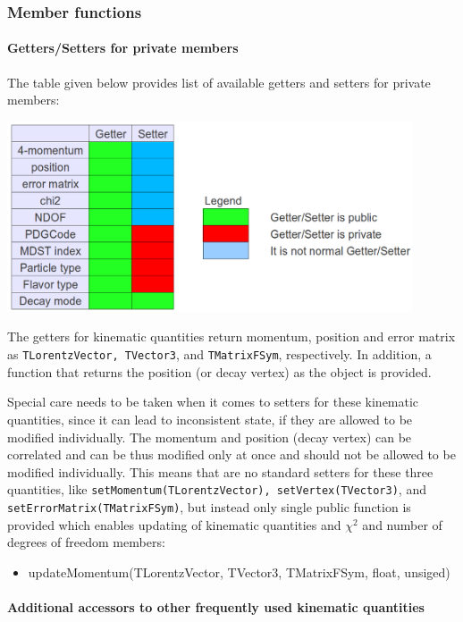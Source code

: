 \subsubsection{Member functions}

\paragraph{Getters/Setters for private members}

The table given below provides list of available getters and setters for private members:
\begin{center}
 \includegraphics[width=0.9\textwidth]{DataModel/figs/particleGetterSetter.png}
\end{center}
The getters for kinematic quantities return momentum, position and error matrix as {\tt TLorentzVector, TVector3}, and {\tt TMatrixFSym}, 
respectively. In addition, a function that returns the position (or decay vertex) as the \vertex object is provided.

Special care needs to be taken when it comes to setters for these kinematic quantities, since it can lead to inconsistent 
state, if they are allowed to be modified individually. The momentum and position (decay vertex)
can be correlated and can be thus modified only at once and should not be allowed to be modified individually. 
This means that are no standard setters for these three quantities, like {\tt setMomentum(TLorentzVector), setVertex(TVector3)}, and 
{\tt setErrorMatrix(TMatrixFSym)}, but instead only single public function is provided which enables updating of kinematic quantities
and $\chi^2$ and number of degrees of freedom members:
\begin{itemize}
 \item {\bluett updateMomentum(TLorentzVector, TVector3, TMatrixFSym, float, unsiged)}
\end{itemize}

\paragraph{Additional accessors to other frequently used kinematic quantities}

